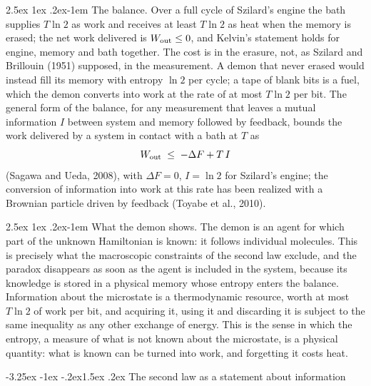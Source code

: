 \documentclass[10pt,a4paper]{article}
\makeatletter
\renewcommand{\subsection}{\@startsection{subsection}{2}{\z@}%
  {-3.25ex \@plus -1ex \@minus -.2ex}{1.5ex \@plus .2ex}%
  {\normalfont\fontsize{15.5pt}{19pt}\selectfont\bfseries}}
\renewcommand{\paragraph}{\@startsection{paragraph}{4}{\z@}%
  {2.5ex \@plus 1ex \@minus .2ex}{-1em}%
  {\normalfont\fontsize{14pt}{17pt}\selectfont\bfseries}}
\makeatother
\begin{document}
\paragraph{The balance.}
Over a full cycle of Szilard's engine the bath supplies $ T\ln2 $ as work and receives at least $ T\ln2 $ as heat when the memory is erased; the net work delivered is $ W_{\rm out} \leq 0 $, and Kelvin's statement holds for engine, memory and bath together.
The cost is in the erasure, not, as Szilard and Brillouin (1951) supposed, in the measurement.
A demon that never erased would instead fill its memory with entropy $ \ln2 $ per cycle; a tape of blank bits is a fuel, which the demon converts into work at the rate of at most $ T\ln2 $ per bit.
The general form of the balance, for any measurement that leaves a mutual information $ I $ between system and memory followed by feedback, bounds the work delivered by a system in contact with a bath at $ T $ as
\[
  W_{\rm out} \;\leq\; -\Delta F + T\,I
\]
(Sagawa and Ueda, 2008), with $ \Delta F = 0 $, $ I = \ln2 $ for Szilard's engine; the conversion of information into work at this rate has been realized with a Brownian particle driven by feedback (Toyabe et al., 2010).

\paragraph{What the demon shows.}
The demon is an agent for which part of the unknown Hamiltonian is known: it follows individual molecules.
This is precisely what the macroscopic constraints of the second law exclude, and the paradox disappears as soon as the agent is included in the system, because its knowledge is stored in a physical memory whose entropy enters the balance.
Information about the microstate is a thermodynamic resource, worth at most $ T\ln2 $ of work per bit, and acquiring it, using it and discarding it is subject to the same inequality as any other exchange of energy.
This is the sense in which the entropy, a measure of what is not known about the microstate, is a physical quantity: what is known can be turned into work, and forgetting it costs heat.

\subsection{The second law as a statement about information}
\label{sec:found_law}
\end{document}

